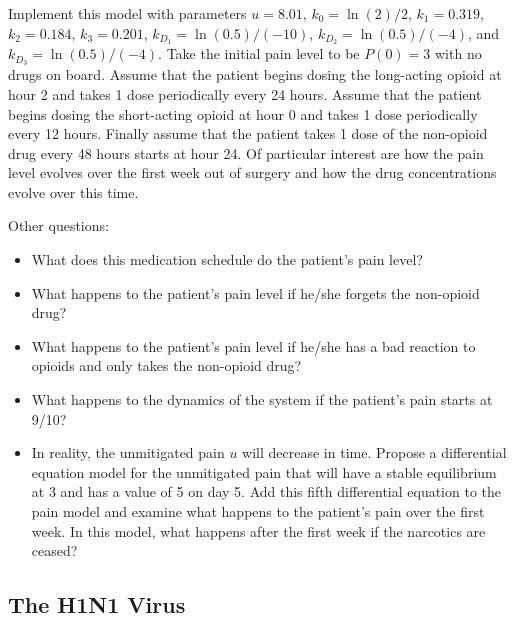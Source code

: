 \documentclass[
]{book}
\theoremstyle{definition}
\theoremstyle{definition}
\theoremstyle{definition}
\theoremstyle{remark}
\begin{document}
Implement this model with parameters \(u=8.01\), \(k_0 = \ln(2)/2\),
\(k_1 = 0.319\), \(k_2 = 0.184\), \(k_3 = 0.201\), \(k_{D_1} = \ln(0.5)/(-10)\), \(k_{D_2} = \ln(0.5)/(-4)\), and
\(k_{D_3} = \ln(0.5)/(-4)\). Take the initial pain level to be \(P(0) = 3\)
with no drugs on board. Assume that the patient begins dosing the
long-acting opioid at hour 2 and takes 1 dose periodically every 24
hours. Assume that the patient begins dosing the short-acting opioid at
hour 0 and takes 1 dose periodically every 12 hours. Finally assume that
the patient takes 1 dose of the non-opioid drug every 48 hours starts at
hour 24. Of particular interest are how the pain level evolves over the
first week out of surgery and how the drug concentrations evolve over
this time.

Other questions:

\begin{itemize}
\item
  What does this medication schedule do the patient's pain level?
\item
  What happens to the patient's pain level if he/she forgets the
  non-opioid drug?
\item
  What happens to the patient's pain level if he/she has a bad
  reaction to opioids and only takes the non-opioid drug?
\item
  What happens to the dynamics of the system if the patient's pain
  starts at 9/10?
\item
  In reality, the unmitigated pain \(u\) will decrease in time. Propose
  a differential equation model for the unmitigated pain that will
  have a stable equilibrium at 3 and has a value of 5 on day 5. Add
  this fifth differential equation to the pain model and examine what
  happens to the patient's pain over the first week. In this model,
  what happens after the first week if the narcotics are ceased?
\end{itemize}

\hypertarget{the-h1n1-virus}{%
\subsection{The H1N1 Virus}\label{the-h1n1-virus}}
\end{document}
